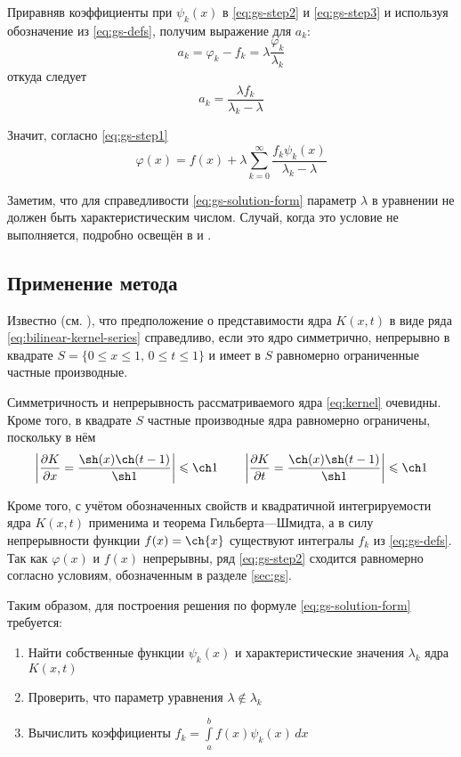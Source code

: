 \documentclass{article}
\numberwithin{equation}{section}
\renewcommand{\phi}{\varphi}
\renewcommand{\leq}{\leqslant}
\newcommand{\intl}{\int\limits}
\providecommand{\pardiff}[2]{\frac{\partial{#1}}{\partial{#2}}}
\providecommand{\abs}[1]{\left \lvert{#1}\right \rvert}
\begin{document}
Приравняв коэффициенты при $\psi_k(x)$ в \eqref{eq:gs-step2} и
\eqref{eq:gs-step3} и используя обозначение из \eqref{eq:gs-defs},
получим выражение для $a_k$:
\begin{equation*}
  a_k = \phi_k-f_k = \lambda\frac{\phi_k}{\lambda_k}
\end{equation*}
откуда следует
\begin{equation}
  a_k = \frac{\lambda f_k}{\lambda_k - \lambda}
\end{equation}

Значит, согласно \eqref{eq:gs-step1}
\begin{equation}
  \label{eq:gs-solution-form}
  \phi(x) = f(x) + \lambda\sum_{k=0}^\infty{\frac{f_k \psi_k(x)}{\lambda_k-\lambda}}
\end{equation}

Заметим, что для справедливости \eqref{eq:gs-solution-form} параметр
$\lambda$ в уравнении не должен быть характеристическим числом.
Случай, когда это условие не выполняется, подробно освещён в
\cite{krasnov76} и \cite{polyanin03}.

\subsection{Применение метода}

Известно (см. \cite{polyanin03}), что предположение о представимости
ядра $K(x, t)$ в виде ряда \eqref{eq:bilinear-kernel-series}
справедливо, если это ядро симметрично, непрерывно в квадрате
$S=\{0\leq x \leq 1,\, 0 \leq t \leq 1\}$ и имеет в $S$ равномерно
ограниченные частные производные.

Симметричность и непрерывность рассматриваемого ядра \eqref{eq:kernel}
очевидны. Кроме того, в квадрате $S$ частные производные ядра
равномерно ограничены, поскольку в нём
\begin{equation*}
  \abs{\pardiff{K}{x} = \frac{\sh(x)\ch(t-1)}{\sh 1}} \leq \ch1 \qquad
  \abs{\pardiff{K}{t} = \frac{\ch(x)\sh(t-1)}{\sh 1}} \leq \ch1
\end{equation*}

Кроме того, с учётом обозначенных свойств и квадратичной
интегрируемости ядра $K(x, t)$ применима и теорема Гильберта—Шмидта, а
в силу непрерывности функции $f(x)=\ch{x}$ существуют интегралы $f_k$
из \eqref{eq:gs-defs}. Так как $\phi(x)$ и $f(x)$ непрерывны, ряд
\eqref{eq:gs-step2} сходится равномерно согласно условиям,
обозначенным в разделе \ref{sec:gs}.

Таким образом, для построения решения по формуле
\eqref{eq:gs-solution-form} требуется:
\begin{enumerate}
\item Найти собственные функции $\psi_k(x)$ и характеристические
  значения $\lambda_k$ ядра $K(x, t)$
\item Проверить, что параметр уравнения $\lambda \notin {\lambda_k}$
\item Вычислить коэффициенты $f_k = \intl_a^b{f(x)\psi_k(x)\,dx}$
\end{enumerate}
\end{document}
